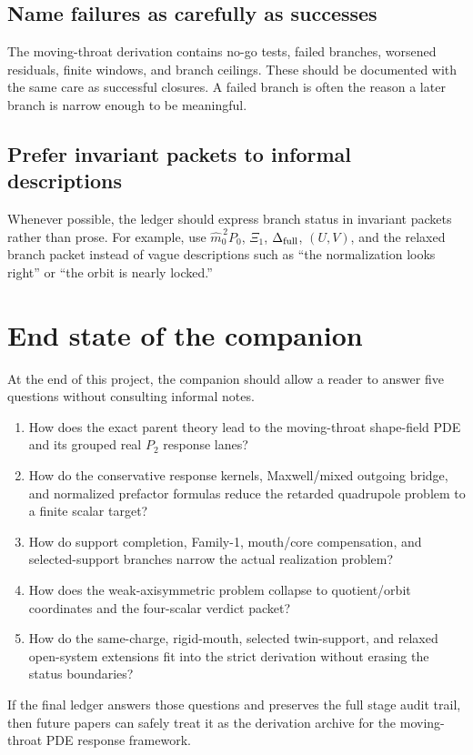 \subsection{Name failures as carefully as successes}

The moving-throat derivation contains no-go tests, failed branches, worsened residuals, finite windows, and branch ceilings.  These should be documented with the same care as successful closures.  A failed branch is often the reason a later branch is narrow enough to be meaningful.

\subsection{Prefer invariant packets to informal descriptions}

Whenever possible, the ledger should express branch status in invariant packets rather than prose.  For example, use \(\widehat m_0^{\,2}P_0\), \(\Xi_1\), \(\Delta_{\rm full}\), \((U,V)\), and the relaxed branch packet instead of vague descriptions such as ``the normalization looks right'' or ``the orbit is nearly locked.''

\section{End state of the companion}

At the end of this project, the companion should allow a reader to answer five questions without consulting informal notes.

\begin{enumerate}[leftmargin=2.2em]
  \item How does the exact parent theory lead to the moving-throat shape-field PDE and its grouped real \(P_2\) response lanes?
  \item How do the conservative response kernels, Maxwell/mixed outgoing bridge, and normalized prefactor formulas reduce the retarded quadrupole problem to a finite scalar target?
  \item How do support completion, Family-1, mouth/core compensation, and selected-support branches narrow the actual realization problem?
  \item How does the weak-axisymmetric problem collapse to quotient/orbit coordinates and the four-scalar verdict packet?
  \item How do the same-charge, rigid-mouth, selected twin-support, and relaxed open-system extensions fit into the strict derivation without erasing the status boundaries?
\end{enumerate}

If the final ledger answers those questions and preserves the full stage audit trail, then future papers can safely treat it as the derivation archive for the moving-throat PDE response framework.
